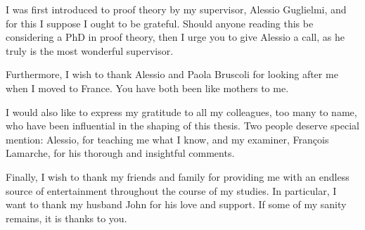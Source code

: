 I was first introduced to proof theory by my supervisor, Alessio Guglielmi, and for this I suppose I ought to be grateful. Should anyone reading this be considering a PhD in proof theory, then I urge you to give Alessio a call, as he truly is the most wonderful supervisor.

Furthermore, I wish to thank Alessio and Paola Bruscoli for looking after me when I moved to France. You have both been like mothers to me.

I would also like to express my gratitude to all my colleagues, too many to name, who have been influential in the shaping of this thesis. Two people deserve special mention: Alessio, for teaching me what I know, and my examiner, Fran\c{c}ois Lamarche, for his thorough and insightful comments.

Finally, I wish to thank my friends and family for providing me with an endless source of entertainment throughout the course of my studies. In particular, I want to thank my husband John for his love and support. If some of my sanity remains, it is thanks to you.
